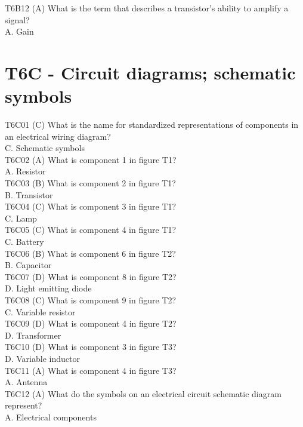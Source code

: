 \documentclass[12pt,letterpaper]{report}
\begin{document}
T6B12 (A) What is the term that describes a transistor's ability to amplify a signal?\\
A. Gain\\

\section{T6C - Circuit diagrams; schematic symbols}

T6C01 (C) What is the name for standardized representations of components in an electrical wiring diagram?\\
C. Schematic symbols\\

T6C02 (A) What is component 1 in figure T1?\\
A. Resistor\\

T6C03 (B) What is component 2 in figure T1?\\
B. Transistor\\

T6C04 (C) What is component 3 in figure T1?\\
C. Lamp\\

T6C05 (C) What is component 4 in figure T1?\\
C. Battery\\

T6C06 (B) What is component 6 in figure T2?\\
B. Capacitor\\

T6C07 (D) What is component 8 in figure T2?\\
D. Light emitting diode\\

T6C08 (C) What is component 9 in figure T2?\\
C. Variable resistor\\

T6C09 (D) What is component 4 in figure T2?\\
D. Transformer\\

T6C10 (D) What is component 3 in figure T3?\\
D. Variable inductor\\

T6C11 (A) What is component 4 in figure T3?\\
A. Antenna\\

T6C12 (A) What do the symbols on an electrical circuit schematic diagram represent?\\
A. Electrical components\\
\end{document}
